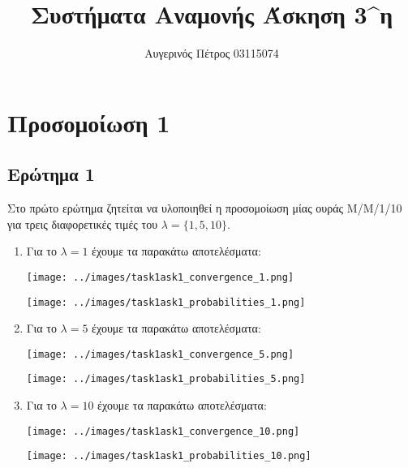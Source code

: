 \documentclass[12pt]{article}
\author{Αυγερινός Πέτρος 03115074}
\title{Συστήματα Αναμονής Άσκηση 3^η}
\date{}
\begin{document}
\maketitle 
\pagebreak

\tableofcontents
\pagebreak

\section{Προσομοίωση 1}
\subsection{Ερώτημα 1}

Στο πρώτο ερώτημα ζητείται να υλοποιηθεί η προσομοίωση μίας 
ουράς M/M/1/10 για τρεις διαφορετικές τιμές του 
$\lambda = \{ 1, 5, 10\}$.

\begin{enumerate}
    \item{}
        Για το $\lambda = 1$ έχουμε τα παρακάτω αποτελέσματα:

        \begin{center}
            \texttt{[image: ../images/task1ask1\_convergence\_1.png]}
        \end{center}

        \begin{center}
            \texttt{[image: ../images/task1ask1\_probabilities\_1.png]}
        \end{center}

    \item{}
        Για το $\lambda = 5$ έχουμε τα παρακάτω αποτελέσματα:

        \begin{center}
            \texttt{[image: ../images/task1ask1\_convergence\_5.png]}
        \end{center}

        \begin{center}
            \texttt{[image: ../images/task1ask1\_probabilities\_5.png]}
        \end{center}

    \item{}
        Για το $\lambda = 10$ έχουμε τα παρακάτω αποτελέσματα:

        \begin{center}
            \texttt{[image: ../images/task1ask1\_convergence\_10.png]}
        \end{center}

        \begin{center}
            \texttt{[image: ../images/task1ask1\_probabilities\_10.png]}
        \end{center}
\end{enumerate}
\end{document}
